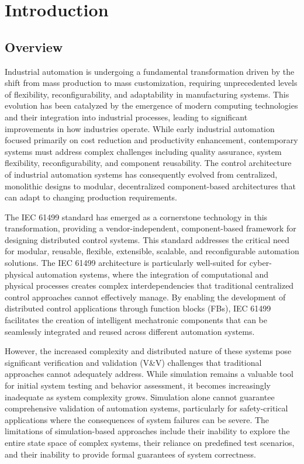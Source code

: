 
\section{Introduction}
\subsection{Overview}

Industrial automation is undergoing a fundamental transformation driven by the shift from mass production to mass customization, requiring unprecedented levels of flexibility, reconfigurability, and adaptability in manufacturing systems. This evolution has been catalyzed by the emergence of modern computing technologies and their integration into industrial processes, leading to significant improvements in how industries operate. While early industrial automation focused primarily on cost reduction and productivity enhancement, contemporary systems must address complex challenges including quality assurance, system flexibility, reconfigurability, and component reusability. The control architecture of industrial automation systems has consequently evolved from centralized, monolithic designs to modular, decentralized component-based architectures that can adapt to changing production requirements.

The IEC 61499 standard has emerged as a cornerstone technology in this transformation, providing a vendor-independent, component-based framework for designing distributed control systems. This standard addresses the critical need for modular, reusable, flexible, extensible, scalable, and reconfigurable automation solutions. The IEC 61499 architecture is particularly well-suited for cyber-physical automation systems, where the integration of computational and physical processes creates complex interdependencies that traditional centralized control approaches cannot effectively manage. By enabling the development of distributed control applications through function blocks (FBs), IEC 61499 facilitates the creation of intelligent mechatronic components that can be seamlessly integrated and reused across different automation systems.

However, the increased complexity and distributed nature of these systems pose significant verification and validation (V\&V) challenges that traditional approaches cannot adequately address. While simulation remains a valuable tool for initial system testing and behavior assessment, it becomes increasingly inadequate as system complexity grows. Simulation alone cannot guarantee comprehensive validation of automation systems, particularly for safety-critical applications where the consequences of system failures can be severe. The limitations of simulation-based approaches include their inability to explore the entire state space of complex systems, their reliance on predefined test scenarios, and their inability to provide formal guarantees of system correctness.

